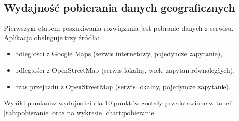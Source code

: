 \subsection*{Wydajność pobierania danych geograficznych}

Pierwszym etapem poszukiwania rozwiązania jest pobranie danych z serwisu. Aplikacja obsługuje trzy źródła: 
\begin{itemize}
	\item odległości z Google Maps (serwis internetowy, pojedyncze zapytanie),
	\item odległości z OpenStreetMap (serwis lokalny, wiele zapytań równoległych),
	\item czas przejazdu z OpenStreetMap (serwis lokalny, pojedyncze zapytanie).
\end{itemize}

Wyniki pomiarów wydajności dla 10 punktów zostały przedstawione w tabeli \ref{tab:pobieranie} oraz na wykresie \ref{chart:pobieranie}.


